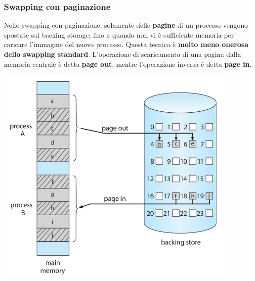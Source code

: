 \documentclass[12pt]{article}
\begin{document}
\subsubsection{Swapping con paginazione}
Nello swapping con paginazione, solamente delle \textbf{pagine} di un processo vengono spostate sul backing storage; fino a quando non vi è sufficiente memoria per caricare l'immagine del nuovo processo.
Questa tecnica è \textbf{molto meno onerosa dello swapping standard}.
L'operazione di scaricamento di una pagina dalla memoria centrale è detta \textbf{page out}, mentre l'operazione inversa è detta \textbf{page in}.
\begin{center}
    \includegraphics[width = 0.70\linewidth]{Images/67.png}
\end{center}
\end{document}
